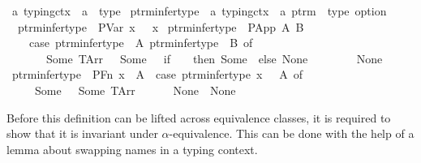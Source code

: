 \begin{implementation}
\isamarkupfalse%
\ {\isacharprime}a\ typing{\isacharunderscore}ctx\ {\isacharequal}\ {\isachardoublequoteopen}{\isacharprime}a\ {\isasymrightharpoonup}\ type{\isachardoublequoteclose}\isanewline
\isanewline
{}\isamarkupfalse%
\ ptrm{\isacharunderscore}infer{\isacharunderscore}type\ {\isacharcolon}{\isacharcolon}\ {\isachardoublequoteopen}{\isacharprime}a\ typing{\isacharunderscore}ctx\ {\isasymRightarrow}\ {\isacharprime}a\ ptrm\ {\isasymRightarrow}\ type\ option{\isachardoublequoteclose}\ \isanewline
\ \ {\isachardoublequoteopen}ptrm{\isacharunderscore}infer{\isacharunderscore}type\ {\isasymGamma}\ {\isacharparenleft}PVar\ x{\isacharparenright}\ {\isacharequal}\ {\isasymGamma}\ x{\isachardoublequoteclose}\isanewline
{\isacharbar}\ {\isachardoublequoteopen}ptrm{\isacharunderscore}infer{\isacharunderscore}type\ {\isasymGamma}\ {\isacharparenleft}PApp\ A\ B{\isacharparenright}\ {\isacharequal}\isanewline
\ \ \ \ {\isacharparenleft}case\ {\isacharparenleft}ptrm{\isacharunderscore}infer{\isacharunderscore}type\ {\isasymGamma}\ A{\isacharcomma}\ ptrm{\isacharunderscore}infer{\isacharunderscore}type\ {\isasymGamma}\ B{\isacharparenright}\ of\isanewline
\ \ \ \ \ \ \ {\isacharparenleft}Some\ {\isacharparenleft}TArr\ {\isasymtau}\ {\isasymsigma}{\isacharparenright}{\isacharcomma}\ Some\ {\isasymtau}{\isacharprime}{\isacharparenright}\ {\isasymRightarrow}\ {\isacharparenleft}if\ {\isasymtau}\ {\isacharequal}\ {\isasymtau}{\isacharprime}\ then\ Some\ {\isasymsigma}\ else\ None{\isacharparenright}\isanewline
\ \ \ \ \ {\isacharbar}\ {\isacharunderscore}\ {\isasymRightarrow}\ None\isanewline
\ \ \ {\isacharparenright}{\isachardoublequoteclose}\isanewline
{\isacharbar}\ {\isachardoublequoteopen}ptrm{\isacharunderscore}infer{\isacharunderscore}type\ {\isasymGamma}\ {\isacharparenleft}PFn\ x\ {\isasymtau}\ A{\isacharparenright}\ {\isacharequal}\ {\isacharparenleft}case\ ptrm{\isacharunderscore}infer{\isacharunderscore}type\ {\isacharparenleft}{\isasymGamma}{\isacharparenleft}x\ {\isasymmapsto}\ {\isasymtau}{\isacharparenright}{\isacharparenright}\ A\ of\isanewline
\ \ \ \ \ Some\ {\isasymsigma}\ {\isasymRightarrow}\ Some\ {\isacharparenleft}TArr\ {\isasymtau}\ {\isasymsigma}{\isacharparenright}\isanewline
\ \ \ {\isacharbar}\ None\ {\isasymRightarrow}\ None\isanewline
\ \ \ {\isacharparenright}{\isachardoublequoteclose}\isanewline
\end{implementation}

Before this definition can be lifted across equivalence classes, it is required to show that it is invariant under \(\alpha\)-equivalence.
This can be done with the help of a lemma about swapping names in a typing context.

